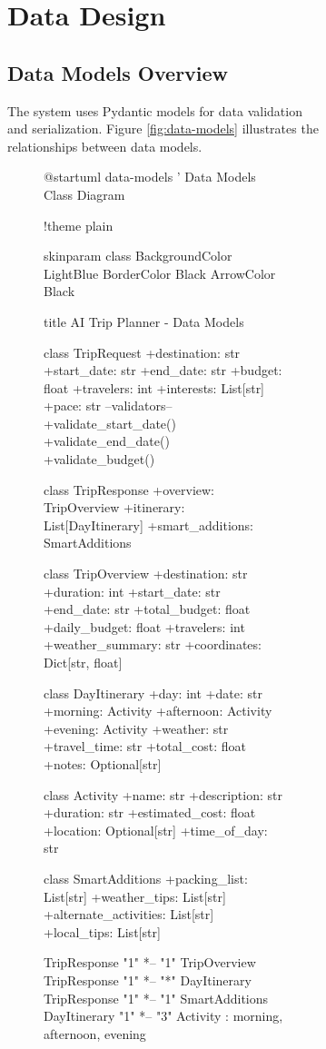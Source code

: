 \documentclass[12pt,a4paper]{report}
\begin{document}
\begin{figure}[H]
\begin{plantuml}
\begin{figure}[H]
\begin{plantuml}
\chapter{Data Design}

\section{Data Models Overview}

The system uses Pydantic models for data validation and serialization. Figure \ref{fig:data-models} illustrates the relationships between data models.

\begin{figure}[H]
    \centering
    \begin{plantuml}
@startuml data-models
' Data Models Class Diagram

!theme plain

skinparam class {
    BackgroundColor LightBlue
    BorderColor Black
    ArrowColor Black
}

title AI Trip Planner - Data Models

class TripRequest {
    +destination: str
    +start_date: str
    +end_date: str
    +budget: float
    +travelers: int
    +interests: List[str]
    +pace: str
    --validators--
    +validate_start_date()
    +validate_end_date()
    +validate_budget()
}

class TripResponse {
    +overview: TripOverview
    +itinerary: List[DayItinerary]
    +smart_additions: SmartAdditions
}

class TripOverview {
    +destination: str
    +duration: int
    +start_date: str
    +end_date: str
    +total_budget: float
    +daily_budget: float
    +travelers: int
    +weather_summary: str
    +coordinates: Dict[str, float]
}

class DayItinerary {
    +day: int
    +date: str
    +morning: Activity
    +afternoon: Activity
    +evening: Activity
    +weather: str
    +travel_time: str
    +total_cost: float
    +notes: Optional[str]
}

class Activity {
    +name: str
    +description: str
    +duration: str
    +estimated_cost: float
    +location: Optional[str]
    +time_of_day: str
}

class SmartAdditions {
    +packing_list: List[str]
    +weather_tips: List[str]
    +alternate_activities: List[str]
    +local_tips: List[str]
}

TripResponse "1" *-- "1" TripOverview
TripResponse "1" *-- "*" DayItinerary
TripResponse "1" *-- "1" SmartAdditions
DayItinerary "1" *-- "3" Activity : morning, afternoon, evening


\end{plantuml}
\end{figure}
\end{plantuml}
\end{figure}
\end{plantuml}
\end{figure}
\end{document}

